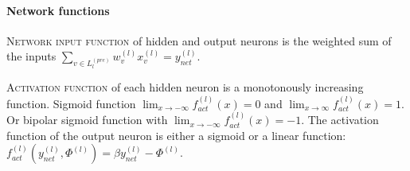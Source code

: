 \paragraph{Network functions}
\textsc{Network input function} of hidden and output neurons is the weighted sum of the inputs $\sum_{v\in L_l^{(pre)}} w_v^{(l)}x_v^{(l)} = y_{net}^{(l)}$. \vspace{0.1cm}

\textsc{Activation function} of each hidden neuron is a monotonously increasing function. Sigmoid function $\lim_{x\rightarrow -\infty} f_{act}^{(l)}(x)=0$ and $\lim_{x\rightarrow \infty} f_{act}^{(l)}(x)=1$. Or bipolar sigmoid function with $\lim_{x\rightarrow -\infty} f_{act}^{(l)}(x)=-1$. The activation function of the output neuron is either a sigmoid or a linear function: $f_{act}^{(l)}\left( y_{net}^{(l)}, \Phi^{(l)}\right) = \beta y_{net}^{(l)} -\Phi^{(l)}$.

